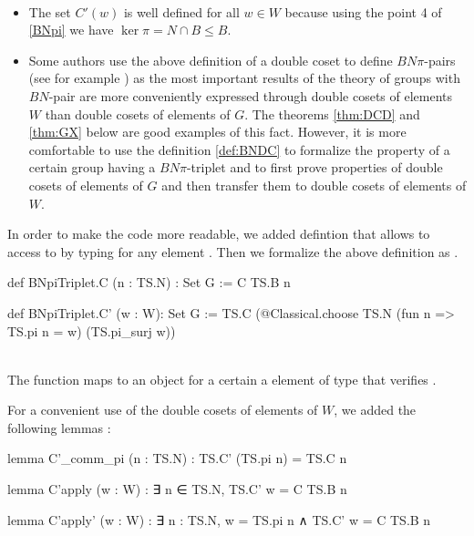 \begin{remark} \

    \begin{itemize}
        \item The set $C'\left( w \right)$ is well defined for all $w \in W$ because using the point 4 of \ref{BNpi} we have $\ker \pi = N \cap B \le B$.
        \item Some authors use the above definition of a double coset to define $BN\pi$-pairs (see for example \cite{bourbaki_groupes_2007}) as the most important results of the theory of groups with $BN$-pair are more conveniently expressed through double cosets of elements $W$ than double cosets of elements of $G$. The theorems \ref{thm:DCD} and \ref{thm:GX} below are good examples of this fact.
However, it is more comfortable to use the definition \ref{def:BNDC} to formalize the property of a certain group having a $BN\pi$-triplet and to first prove properties of double cosets of elements of $G$ and then transfer them to double cosets of elements of $W$.
\end{itemize}
\end{remark}

In order to make the \Lean code more readable, we added  defintion that allows to access to  by typing  for any element . Then we formalize the above definition as .
\begin{leancode}
def BNpiTriplet.C (n : TS.N) : Set G := C TS.B n

def BNpiTriplet.C' (w : W): Set G := 
  TS.C (@Classical.choose TS.N (fun n => TS.pi n = w) (TS.pi_surj w))
\end{leancode} 

\begin{commentary} ~\\
\noindent
The function   maps to an object  for a certain  a element of type  that verifies .
\end{commentary}

For a convenient use of the double cosets of elements of $W$, we added the following lemmas :

\begin{leancode}
lemma C'_comm_pi (n : TS.N) : TS.C' (TS.pi n) = TS.C n 

lemma C'apply (w : W) : ∃ n ∈ TS.N, TS.C' w = C TS.B n 

lemma C'apply' (w : W) : ∃ n : TS.N, w = TS.pi n ∧ TS.C' w = C TS.B n
\end{leancode}

